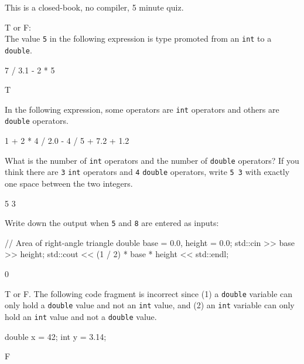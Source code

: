 

This is a closed-book, no compiler, 5 minute quiz.

\nextq
T or F:
\\
The value \verb!5! in the following expression is
type promoted from an \verb!int! to a \verb!double!.
\begin{console}[fontsize=\small]
7 / 3.1 - 2 * 5
\end{console}
\ANSWER
\begin{answercode}
T
\end{answercode}

\nextq
In the following expression, some operators are \verb!int!
operators and others are \verb!double! operators.
\begin{console}[fontsize=\small]
1 + 2 * 4 / 2.0 - 4 / 5 + 7.2 + 1.2
\end{console}
What is the number of \verb!int! operators and the number of
\verb!double! operators?
If you think there are \verb!3! \verb!int! operators and
\verb!4! \verb!double! operators, write \verb!5 3! with
exactly one space between the two integers.
\\
\ANSWER
\begin{answercode}
5 3
\end{answercode}

\nextq
Write down the output when
\verb!5! and \verb!8! are entered as inputs:
\begin{console}[fontsize=\small]
// Area of right-angle triangle
double base = 0.0, height = 0.0;
std::cin >> base >> height;
std::cout << (1 / 2) * base * height << std::endl;
\end{console}
\ANSWER
\begin{answercode}
0
\end{answercode}

\nextq
T or F.
The following code fragment is incorrect since
(1) a \verb!double! variable can only hold a \verb!double! value
and not an \verb!int! value, and
(2) an \verb!int! variable can only hold an \verb!int! value
and not a \verb!double! value.
\begin{console}[fontsize=\small]
double x = 42;
int y = 3.14;
\end{console}
\ANSWER
\begin{answercode}
F
\end{answercode}


